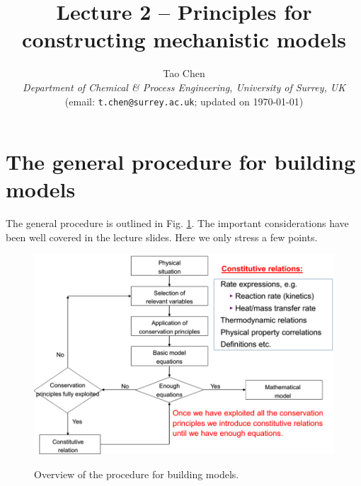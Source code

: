 \documentclass[a4paper,11pt]{article}
\title{\vspace{-2cm} Lecture 2 -- Principles for constructing mechanistic models}
\author{Tao Chen\\
{\small \emph{Department of Chemical \& Process Engineering, University of Surrey, UK}}\\
{\small (email: \texttt{t.chen@surrey.ac.uk}; \hspace{0.5cm} updated on \today )}
}
\date{}
\theoremstyle{definition}
\begin{document}
\maketitle

\vspace{-0.5cm}


\section{The general procedure for building models}

The general procedure is outlined in Fig. \ref{fig:procedure}.
The important considerations have been well covered in the lecture slides.
Here we only stress a few points.

\begin{figure} [!h]
 \begin{center}
	\includegraphics[width=.9\textwidth]{procedure}\\
 \end{center}
 \caption{Overview of the procedure for building models.} 
 \label{fig:procedure}
\end{figure}
\end{document}
